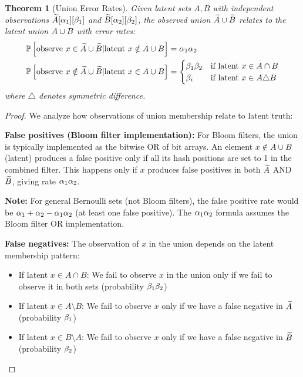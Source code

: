 \documentclass[11pt,final,hidelinks]{article}
\newtheorem{theorem}{Theorem}[section]
\begin{document}
\begin{theorem}[Union Error Rates]
Given latent sets $A, B$ with independent observations $\widetilde{A}[\alpha_1][\beta_1]$ and $\widetilde{B}[\alpha_2][\beta_2]$, the observed union $\widetilde{A} \cup \widetilde{B}$ relates to the latent union $A \cup B$ with error rates:
\begin{align}
\mathbb{P}\left[\text{observe } x \in \widetilde{A} \cup \widetilde{B} | \text{latent } x \notin A \cup B\right] &= \alpha_1 \alpha_2 \\
\mathbb{P}\left[\text{observe } x \notin \widetilde{A} \cup \widetilde{B} | \text{latent } x \in A \cup B\right] &= \begin{cases}
\beta_1 \beta_2 & \text{if latent } x \in A \cap B \\
\beta_i & \text{if latent } x \in A \triangle B
\end{cases}
\end{align}
where $\triangle$ denotes symmetric difference.
\end{theorem}

\begin{proof}
We analyze how observations of union membership relate to latent truth:

\textbf{False positives (Bloom filter implementation):} For Bloom filters, the union is typically implemented as the bitwise OR of bit arrays. An element $x \notin A \cup B$ (latent) produces a false positive only if all its hash positions are set to 1 in the combined filter. This happens only if $x$ produces false positives in both $\widetilde{A}$ AND $\widetilde{B}$, giving rate $\alpha_1 \alpha_2$.

\textbf{Note:} For general Bernoulli sets (not Bloom filters), the false positive rate would be $\alpha_1 + \alpha_2 - \alpha_1\alpha_2$ (at least one false positive). The $\alpha_1 \alpha_2$ formula assumes the Bloom filter OR implementation.

\textbf{False negatives:} The observation of $x$ in the union depends on the latent membership pattern:
\begin{itemize}
    \item If latent $x \in A \cap B$: We fail to observe $x$ in the union only if we fail to observe it in both sets (probability $\beta_1 \beta_2$)
    \item If latent $x \in A \setminus B$: We fail to observe $x$ only if we have a false negative in $\widetilde{A}$ (probability $\beta_1$)
    \item If latent $x \in B \setminus A$: We fail to observe $x$ only if we have a false negative in $\widetilde{B}$ (probability $\beta_2$)
\end{itemize}
\end{proof}
\end{document}
